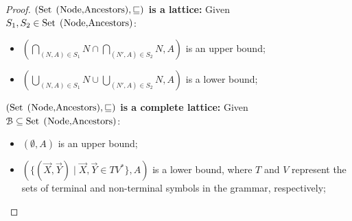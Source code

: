 \begin{proof}
	\noindent\textbf{$(\text{\lstinline{Set (Node,Ancestors)}}, \leqSets)$
	is a lattice:} Given 
	$S_1, S_2\in \text{\lstinline{Set (Node,Ancestors)}}$:
	\begin{itemize}
		\item $(\bigcap_{(N,A)\in S_1}N\cap 
		      \bigcap_{(N',A)\in S_2}N, A)$ is an upper bound;
		\item $(\bigcup_{(N,A)\in S_1}N\cup 
		      \bigcup_{(N',A)\in S_2}N, A)$ is a lower bound;
	\end{itemize}
	
	\noindent\textbf{$(\text{\lstinline{Set (Node,Ancestors)}}, \leqSets)$
	is a complete lattice:} Given 
	$\mathcal{B}\subseteq \text{\lstinline{Set (Node,Ancestors)}}$:
	\begin{itemize}
		\item $(\emptyset, A)$ is an upper bound;
		\item $(\{(\vec X, \vec Y) \mid \vec X, \vec Y \in T V^*\}, A)$ 
			  is a lower bound, where $T$ and $V$ represent the sets of 
			  terminal and non-terminal symbols in the grammar,
			  respectively;
	\end{itemize}
	

\end{proof}
